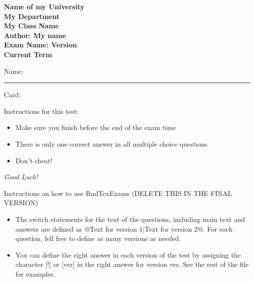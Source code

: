 \documentclass[10pt, answers]{exam}
\newcommand{\myversion}{} %
\newcommand{\UniName}{Name of my University}
\newcommand{\DeptName}{My Department}
\newcommand{\ClassName}{My Class Name}
\newcommand{\MyName}{Author: My name}
\newcommand{\ExamName}{Exam Name: Version \myversion}
\newcommand{\TermName}{Current Term}
\begin{document}
\begin{center}
    \textbf{\Large \UniName} \\
    \textbf{\Large \DeptName} \vspace{0.5cm}  \\
    \textbf{\Large \ClassName} \\
	\textbf{\Large \MyName} \\
    \textbf{\Large \ExamName } \\
    \textbf{\Large \TermName}
 \end{center}

\vspace{1cm}
Name: \rule{4in}{.4pt}  \quad  \noindent Card:\enspace\hrulefill


\vspace{1cm}

\small

\begin{framed}

Instructions for this test:

\begin{itemize}

	\item Make sure you finish before the end of the exam time

	\item There is only one correct answer in all multiple choice questions

	\item Don't cheat!

\end{itemize}

\vspace{0.5cm}

{\large \emph{Good Luck!}}
\end{framed}

\begin{framed}
	Instructions on how to use RndTexExams (DELETE THIS IN THE FINAL VERSION)
	\begin{itemize}

		\item The switch statements for the text of the questions, including main text and answers are defined as @{Text for version 1}|{Text for version 2}@. For each question, fell free to define as many versions as needed.

		\item You can define the right answer in each version of the test by assigning the character [!] or [ver] in the right answer for version ver. See the rest of the file for examples.


	\end{itemize}

\end{framed}
\end{document}
